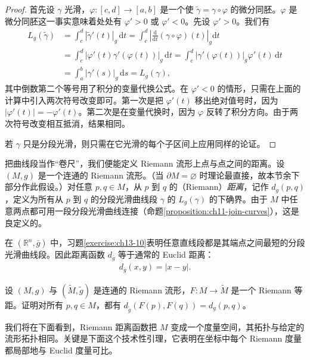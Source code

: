 \documentclass[../../main.tex]{subfiles}
\begin{document}
\begin{proof}
首先设 $\gamma$ 光滑，$\varphi:[c,d]\to[a,b]$ 是一个使 $\widetilde\gamma=\gamma\circ\varphi$ 的微分同胚。$\varphi$ 是微分同胚这一事实意味着处处有 $\varphi'>0$ 或 $\varphi'<0$。先设 $\varphi'>0$。我们有
\begin{align*}
L_g(\widetilde\gamma)
&=\int_c^d |\widetilde\gamma'(t)|_g\,\mathrm{d}t
=\int_c^d \left|\frac{\mathrm{d}}{\mathrm{d}t}(\gamma\circ\varphi)(t)\right|_g\mathrm{d}t\\
&=\int_c^d |\varphi'(t)\gamma'(\varphi(t))|_g\,\mathrm{d}t
=\int_c^d |\gamma'(\varphi(t))|_g\varphi'(t)\,\mathrm{d}t\\
&=\int_a^b |\gamma'(s)|_g\,\mathrm{d}s=L_g(\gamma),
\end{align*}
其中倒数第二个等号用了积分的变量代换公式。在 $\varphi'<0$ 的情形，只需在上面的计算中引入两次符号改变即可。第一次是把 $\varphi'(t)$ 移出绝对值号时，因为 $|\varphi'(t)|=-\varphi'(t)$。第二次是在变量代换时，因为 $\varphi$ 反转了积分方向。由于两次符号改变相互抵消，结果相同。

若 $\gamma$ 只是分段光滑，则只需在它光滑的每个子区间上应用同样的论证。
\end{proof}

把曲线段当作“卷尺”，我们便能定义 Riemann 流形上点与点之间的距离。设 $(M,g)$ 是一个连通的 Riemann 流形。（当 $\partial M=\varnothing$ 时理论最直接，故本节余下部分作此假设。）对任意 $p,q\in M$，从 $p$ 到 $q$ 的（Riemann）\emph{距离}，记作 $d_g(p,q)$，定义为所有从 $p$ 到 $q$ 的分段光滑曲线段 $\gamma$ 的 $L_g(\gamma)$ 的下确界。由于 $M$ 中任意两点都可用一段分段光滑曲线连接（命题\ref{proposition:ch11-join-curves}），这是良定义的。

\begin{example}\label{example:ch13-euclidean-distance}
在 $(\mathbb{R}^n,\bar g)$ 中，习题\ref{exercise:ch13-10}表明任意直线段都是其端点之间最短的分段光滑曲线段。因此距离函数 $d_{\bar g}$ 等于通常的 Euclid 距离：
\begin{align*}
d_{\bar g}(x,y)=|x-y|.
\end{align*}
\end{example}

\begin{exercise}\label{exercise:ch13-27}
设 $(M,g)$ 与 $(\widetilde M,\widetilde g)$ 是连通的 Riemann 流形，$F:M\to\widetilde M$ 是一个 Riemann 等距。证明对所有 $p,q\in M$，都有 $d_{\widetilde g}(F(p),F(q))=d_g(p,q)$。
\end{exercise}

我们将在下面看到，Riemann 距离函数把 $M$ 变成一个度量空间，其拓扑与给定的流形拓扑相同。关键是下面这个技术性引理，它表明在坐标中每个 Riemann 度量都局部地与 Euclid 度量可比。
\end{document}
